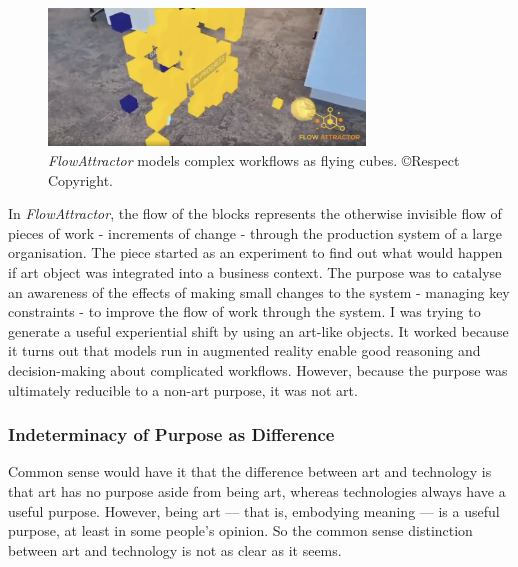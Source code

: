 \documentclass[letterpaper]{article}
\begin{document}
    \begin{figure}[h]
    \includegraphics[width=3.31in]{flow-attractor.png}
    \caption{\emph{FlowAttractor} models complex workflows as flying cubes. \copyright Respect Copyright.}
    \end{figure}

    In \emph{FlowAttractor}, the flow of the blocks represents the otherwise invisible flow of pieces of work - increments of change - through the production system of a large organisation. The piece started as an experiment to find out what would happen if art object was integrated into a business context. The purpose was to catalyse an awareness of the effects of making small changes to the system - managing key constraints - to improve the flow of work through the system. I was trying to generate a useful experiential shift by using an art-like objects. It worked because it turns out that models run in augmented reality enable good reasoning and decision-making about complicated workflows. However, because the purpose was ultimately reducible to a non-art purpose, it was not art.

    \subsubsection{Indeterminacy of Purpose as Difference}

    Common sense would have it that the difference between art and technology is that art has no purpose aside from being art, whereas technologies always have a useful purpose. However, being art — that is, embodying meaning — is a useful purpose, at least in some people's opinion. So the common sense distinction between art and technology is not as clear as it seems.
\end{document}

